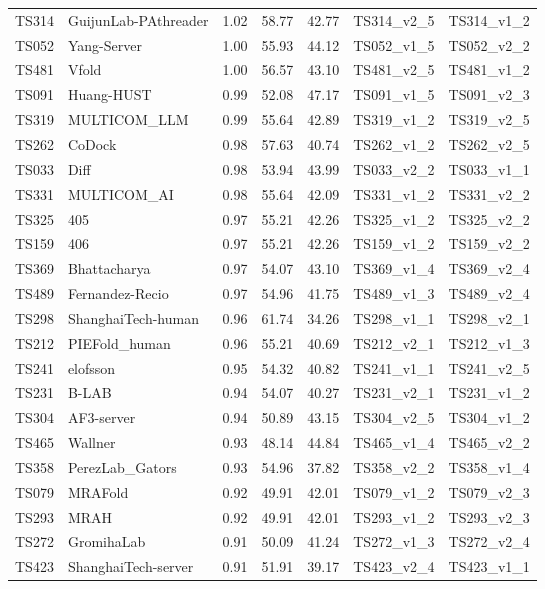 \begin{table}[ht]
{\begin{tabular}{llrrrll}
TS314 & GuijunLab-PAthreader & 1.02 & 58.77 & 42.77 & TS314\_v2\_5 & TS314\_v1\_2 \\ 
TS052 & Yang-Server & 1.00 & 55.93 & 44.12 & TS052\_v1\_5 & TS052\_v2\_2 \\ 
TS481 & Vfold & 1.00 & 56.57 & 43.10 & TS481\_v2\_5 & TS481\_v1\_2 \\ 
TS091 & Huang-HUST & 0.99 & 52.08 & 47.17 & TS091\_v1\_5 & TS091\_v2\_3 \\ 
TS319 & MULTICOM\_LLM & 0.99 & 55.64 & 42.89 & TS319\_v1\_2 & TS319\_v2\_5 \\ 
TS262 & CoDock & 0.98 & 57.63 & 40.74 & TS262\_v1\_2 & TS262\_v2\_5 \\ 
TS033 & Diff & 0.98 & 53.94 & 43.99 & TS033\_v2\_2 & TS033\_v1\_1 \\ 
TS331 & MULTICOM\_AI & 0.98 & 55.64 & 42.09 & TS331\_v1\_2 & TS331\_v2\_2 \\ 
TS325 & 405 & 0.97 & 55.21 & 42.26 & TS325\_v1\_2 & TS325\_v2\_2 \\ 
TS159 & 406 & 0.97 & 55.21 & 42.26 & TS159\_v1\_2 & TS159\_v2\_2 \\ 
TS369 & Bhattacharya & 0.97 & 54.07 & 43.10 & TS369\_v1\_4 & TS369\_v2\_4 \\ 
TS489 & Fernandez-Recio & 0.97 & 54.96 & 41.75 & TS489\_v1\_3 & TS489\_v2\_4 \\ 
TS298 & ShanghaiTech-human & 0.96 & 61.74 & 34.26 & TS298\_v1\_1 & TS298\_v2\_1 \\ 
TS212 & PIEFold\_human & 0.96 & 55.21 & 40.69 & TS212\_v2\_1 & TS212\_v1\_3 \\ 
TS241 & elofsson & 0.95 & 54.32 & 40.82 & TS241\_v1\_1 & TS241\_v2\_5 \\ 
TS231 & B-LAB & 0.94 & 54.07 & 40.27 & TS231\_v2\_1 & TS231\_v1\_2 \\ 
TS304 & AF3-server & 0.94 & 50.89 & 43.15 & TS304\_v2\_5 & TS304\_v1\_2 \\ 
TS465 & Wallner & 0.93 & 48.14 & 44.84 & TS465\_v1\_4 & TS465\_v2\_2 \\ 
TS358 & PerezLab\_Gators & 0.93 & 54.96 & 37.82 & TS358\_v2\_2 & TS358\_v1\_4 \\ 
TS079 & MRAFold & 0.92 & 49.91 & 42.01 & TS079\_v1\_2 & TS079\_v2\_3 \\ 
TS293 & MRAH & 0.92 & 49.91 & 42.01 & TS293\_v1\_2 & TS293\_v2\_3 \\ 
TS272 & GromihaLab & 0.91 & 50.09 & 41.24 & TS272\_v1\_3 & TS272\_v2\_4 \\ 
TS423 & ShanghaiTech-server & 0.91 & 51.91 & 39.17 & TS423\_v2\_4 & TS423\_v1\_1 \\ 

\end{tabular}}
\end{table}
